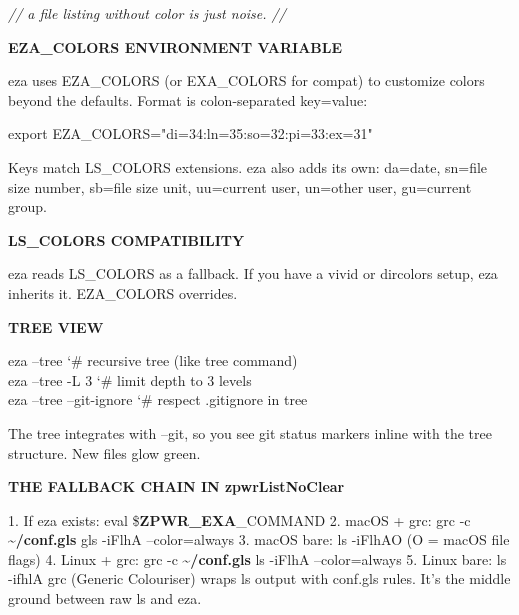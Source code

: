 \documentclass[11pt,a4paper,twoside]{book}
\begin{document}
{\small\itshape\color{dimtext} // a file listing without color is just noise. //}


\vspace{12pt}
{\bfseries\color{neonyellow} EZA\_COLORS ENVIRONMENT VARIABLE}\vspace{4pt}

eza uses EZA\_COLORS (or EXA\_COLORS for compat) to customize colors beyond the defaults. Format is colon-separated key=value:

\begin{codebox}
\color{neongreen}export EZA\_COLORS="di=34:ln=35:so=32:pi=33:ex=31"\\
\end{codebox}

Keys match LS\_COLORS extensions. eza also adds its own: da=date, sn=file size number, sb=file size unit, uu=current user, un=other user, gu=current group.


\vspace{12pt}
{\bfseries\color{neonyellow} LS\_COLORS COMPATIBILITY}\vspace{4pt}

eza reads LS\_COLORS as a fallback. If you have a vivid or dircolors setup, eza inherits it. EZA\_COLORS overrides.


\vspace{12pt}
{\bfseries\color{neonyellow} TREE VIEW}\vspace{4pt}

\begin{codebox}
\color{neongreen}eza --tree          {\char`\#} recursive tree (like tree command)\\
\color{neongreen}eza --tree -L 3     {\char`\#} limit depth to 3 levels\\
\color{neongreen}eza --tree --git-ignore {\char`\#} respect .gitignore in tree\\
\end{codebox}

The tree integrates with --git, so you see git status markers inline with the tree structure. New files glow green.


\vspace{12pt}
{\bfseries\color{neonyellow} THE FALLBACK CHAIN IN zpwrListNoClear}\vspace{4pt}

1. If eza exists: eval \$\textbf{ZPWR\_EXA}\_COMMAND 2. macOS + grc: grc -c \textbf{\textasciitilde{}/conf.gls} gls -iFlhA --color=always 3. macOS bare: ls -iFlhAO (O = macOS file flags) 4. Linux + grc: grc -c \textbf{\textasciitilde{}/conf.gls} ls -iFlhA --color=always 5. Linux bare: ls -ifhlA grc (Generic Colouriser) wraps ls output with conf.gls rules. It's the middle ground between raw ls and eza.
\end{document}
